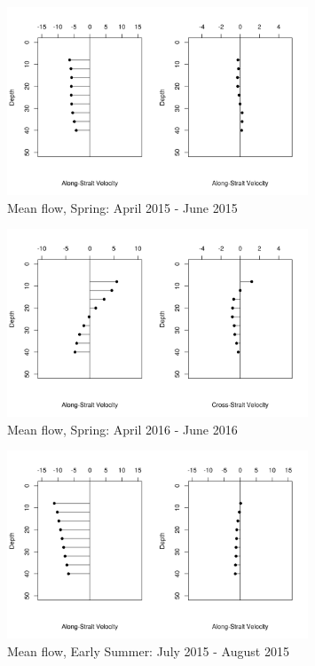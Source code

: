 \documentclass[12pt]{dforeport}
\begin{document}
\begin{figure}  
\centering
\includegraphics[width = 0.8\textwidth]{./figures/44_smf_spring_2015.png}
\caption[Mean flow, Spring, 2015]{Mean flow, Spring: April 2015 - June 2015}
\label{f:smf_s_2015}
\end{figure}

\begin{figure}  
\centering
\includegraphics[width = 0.8\textwidth]{./figures/45_smf_spring_2016.png}
\caption[Mean flow, Spring, 2016]{Mean flow, Spring: April 2016 - June 2016}
\label{f:smf_s_2016}
\end{figure}


\begin{figure}  
\centering
\includegraphics[width = 0.8\textwidth]{./figures/46_smf_earlySummer_2015.png}
\caption[Mean flow, Early Summer, 2015]{Mean flow, Early Summer: July 2015 - August 2015}
\label{f:smf_es_2015}
\end{figure}
\end{document}
